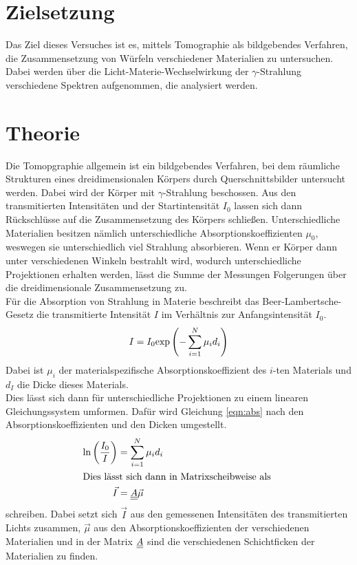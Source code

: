 \section{Zielsetzung}
Das Ziel dieses Versuches ist es, mittels Tomographie als bildgebendes Verfahren, die Zusammensetzung von Würfeln verschiedener Materialien zu untersuchen.
Dabei werden über die Licht-Materie-Wechselwirkung der $\gamma$-Strahlung verschiedene Spektren aufgenommen, die analysiert werden.
	
\section{Theorie}

\noindent
Die Tomopgraphie allgemein ist ein bildgebendes Verfahren, bei dem räumliche Strukturen eines dreidimensionalen Körpers durch Querschnittsbilder untersucht werden.
Dabei wird der Körper mit $\gamma$-Strahlung beschossen. Aus den transmitierten Intensitäten und der Startintensität $I_0$ lassen sich dann Rückschlüsse auf die Zusammensetzung des Körpers schließen.
Unterschiedliche Materialien besitzen nämlich unterschiedliche Absorptionskoeffizienten $\mu_0$, weswegen sie unterschiedlich viel Strahlung absorbieren.
Wenn er Körper dann unter verschiedenen Winkeln bestrahlt wird, wodurch unterschiedliche Projektionen erhalten werden, lässt die Summe der Messungen Folgerungen über die dreidimensionale Zusammensetzung zu.\\
Für die Absorption von Strahlung in Materie beschreibt das Beer-Lambertsche-Gesetz die transmitierte Intensität $I$ im Verhältnis zur Anfangsintensität $I_0$.
\begin{equation}
    I = I_0 \text{exp}\left(- \sum_{i=1}^N \mu_i d_i\right)
    \label{eqn:abs}
\end{equation}
Dabei ist $\mu_i$ der materialspezifische Absorptionskoeffizient des $i$-ten Materials und $d_I$ die Dicke dieses Materials.\\
Dies lässt sich dann für unterschiedliche Projektionen zu einem linearen Gleichungssystem umformen. 
Dafür wird Gleichung \ref{eqn:abs} nach den Absorptionskoeffizienten und den Dicken umgestellt.
\begin{align*}
    \ln\left(\frac{I_0}{I}\right) &= \sum_{i=1}^N \mu_i d_i\\
    \intertext{Dies lässt sich dann in Matrixscheibweise als }
    \vec I &= \underline{\underline{A}} \vec \mu
\end{align*}
schreiben. Dabei setzt sich $\vec I$ aus den gemessenen Intensitäten des transmitierten Lichts zusammen, $\vec \mu$ aus den Absorptionskoeffizienten der verschiedenen Materialien
und in der Matrix $\underline{\underline{A}}$ sind die verschiedenen Schichtficken der Materialien zu finden.\\

